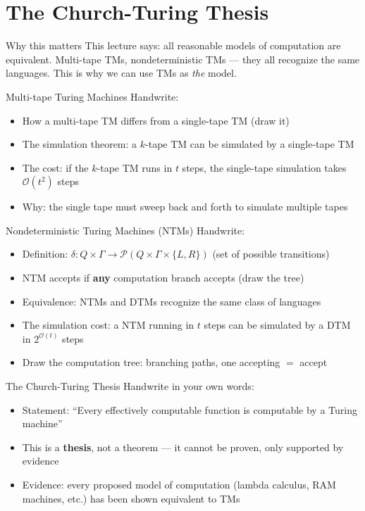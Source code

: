 \documentclass[11pt,a4paper]{article}
\begin{document}
\section{The Church-Turing Thesis}

\begin{whybox}{Why this matters}
This lecture says: all reasonable models of computation are equivalent. Multi-tape TMs, nondeterministic TMs --- they all recognize the same languages. This is why we can use TMs as \textit{the} model.
\end{whybox}

\begin{writebox}{Multi-tape Turing Machines}
Handwrite:
\begin{itemize}[nosep]
\item How a multi-tape TM differs from a single-tape TM (draw it)
\item The simulation theorem: a $k$-tape TM can be simulated by a single-tape TM
\item The cost: if the $k$-tape TM runs in $t$ steps, the single-tape simulation takes $\mathcal{O}(t^2)$ steps
\item Why: the single tape must sweep back and forth to simulate multiple tapes
\end{itemize}
\end{writebox}

\begin{writebox}{Nondeterministic Turing Machines (NTMs)}
Handwrite:
\begin{itemize}[nosep]
\item Definition: $\delta: Q \times \Gamma \rightarrow \mathcal{P}(Q \times \Gamma \times \{L,R\})$ (set of possible transitions)
\item NTM accepts if \textbf{any} computation branch accepts (draw the tree)
\item Equivalence: NTMs and DTMs recognize the same class of languages
\item The simulation cost: a NTM running in $t$ steps can be simulated by a DTM in $2^{\mathcal{O}(t)}$ steps
\item Draw the computation tree: branching paths, one accepting $=$ accept
\end{itemize}
\end{writebox}

\begin{writebox}{The Church-Turing Thesis}
Handwrite in your own words:
\begin{itemize}[nosep]
\item Statement: ``Every effectively computable function is computable by a Turing machine''
\item This is a \textbf{thesis}, not a theorem --- it cannot be proven, only supported by evidence
\item Evidence: every proposed model of computation (lambda calculus, RAM machines, etc.) has been shown equivalent to TMs
\end{itemize}
\end{writebox}
\end{document}
